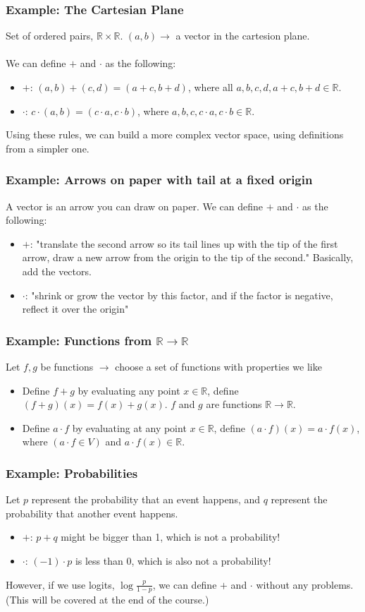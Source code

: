 \documentclass[10pt]{article}
\newcommand{\R}{\mathbb{R}}
\begin{document}
\subsubsection*{Example: The Cartesian Plane}
Set of ordered pairs, $\R \times \R$.  $(a, b) \rightarrow$ a vector in the cartesion plane.\\\\
We can define $+$ and $\cdot$ as the following:
\begin{itemize}
    \item $+$: $(a, b) + (c, d) = (a + c, b + d)$, where all $a, b, c, d, a + c, b + d \in \R$.
    \item $\cdot$: $c \cdot (a, b) = (c \cdot a, c \cdot b)$, where $a, b, c, c \cdot a, c \cdot b \in \R$.
\end{itemize}
Using these rules, we can build a more complex vector space, using definitions from a simpler one.
\subsubsection*{Example: Arrows on paper with tail at a fixed origin}
A vector is an arrow you can draw on paper.  We can define $+$ and $\cdot$ as the following:
\begin{itemize}
    \item $+$: "translate the second arrow so its tail lines up with the tip of the first arrow, draw a new arrow from the origin to the tip of the second."  Basically, add the vectors.
    \item $\cdot$: "shrink or grow the vector by this factor, and if the factor is negative, reflect it over the origin"
\end{itemize}
\subsubsection*{Example: Functions from $\R \rightarrow \R$}
Let $f, g$ be functions $\rightarrow$ choose a set of functions with properties we like
\begin{itemize}
    \item Define $f + g$ by evaluating any point $x \in \R$, define $(f+g)(x) = f(x) + g(x)$.  $f$ and $g$ are functions $\R \rightarrow \R$.
    \item Define $a \cdot f$ by evaluating at any point $x \in \R$, define $(a \cdot f)(x) = a \cdot f(x)$, where $(a \cdot f \in V)$ and $a \cdot f(x) \in \R$.
\end{itemize}
\subsubsection*{Example: Probabilities}
Let $p$ represent the probability that an event happens, and $q$ represent the probability that another event happens.
\begin{itemize}
    \item $+$: $p + q$ might be bigger than 1, which is not a probability!
    \item $\cdot$: $(-1) \cdot p$ is less than 0, which is also not a probability!
\end{itemize}
However, if we use logits, $\log \frac{p}{1-p}$, we can define $+$ and $\cdot$ without any problems.  (This will be covered at the end of the course.)
\end{document}
